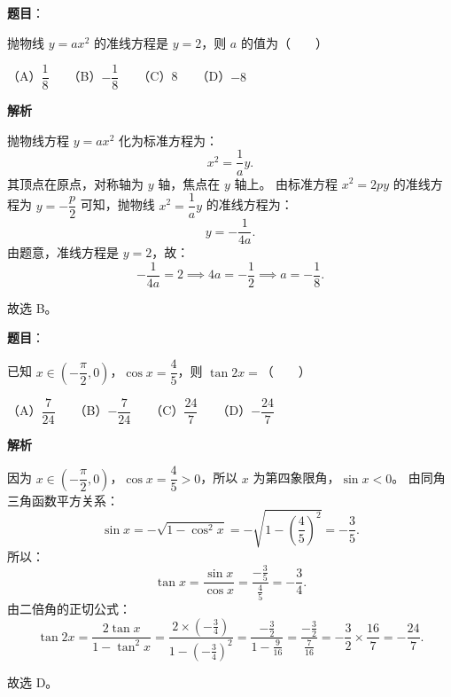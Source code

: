 \begin{answer}

\textbf{题目}：

抛物线 $y = ax^2$ 的准线方程是 $y = 2$，则 $a$ 的值为\mbox{（　　）}

（A）$\dfrac{1}{8}$　　（B）$-\dfrac{1}{8}$　　（C）8　　（D）$-8$

\textbf{解析}

抛物线方程 $y = ax^2$ 化为标准方程为：
\nopagebreak[4]
\[x^2 = \frac{1}{a} y.\]
其顶点在原点，对称轴为 $y$ 轴，焦点在 $y$ 轴上。
由标准方程 $x^2 = 2py$ 的准线方程为 $y = -\dfrac{p}{2}$ 可知，抛物线 $x^2 = \dfrac{1}{a} y$ 的准线方程为：
\nopagebreak[4]
\[y = -\frac{1}{4a}.\]
由题意，准线方程是 $y = 2$，故：
\nopagebreak[4]
\[-\frac{1}{4a} = 2 \implies 4a = -\frac{1}{2} \implies a = -\frac{1}{8}.\]

故选 B。


\end{answer}
\begin{answer}

\textbf{题目}：

已知 $x \in \left(-\dfrac{\pi}{2}, 0\right)$，$\cos x = \dfrac{4}{5}$，则 $\tan 2x =$\mbox{（　　）}

（A）$\dfrac{7}{24}$　　（B）$-\dfrac{7}{24}$　　（C）$\dfrac{24}{7}$　　（D）$-\dfrac{24}{7}$

\textbf{解析}

因为 $x \in \left(-\dfrac{\pi}{2}, 0\right)$，$\cos x = \dfrac{4}{5} > 0$，所以 $x$ 为第四象限角，$\sin x < 0$。
由同角三角函数平方关系：
\nopagebreak[4]
\[\sin x = -\sqrt{1 - \cos^2 x} = -\sqrt{1 - \left(\frac{4}{5}\right)^2} = -\frac{3}{5}.\]
所以：
\nopagebreak[4]
\[\tan x = \frac{\sin x}{\cos x} = \frac{-\frac{3}{5}}{\frac{4}{5}} = -\frac{3}{4}.\]
由二倍角的正切公式：
\nopagebreak[4]
\[\tan 2x = \frac{2\tan x}{1 - \tan^2 x} = \frac{2 \times \left(-\frac{3}{4}\right)}{1 - \left(-\frac{3}{4}\right)^2} = \frac{-\frac{3}{2}}{1 - \frac{9}{16}} = \frac{-\frac{3}{2}}{\frac{7}{16}} = -\frac{3}{2} \times \frac{16}{7} = -\frac{24}{7}.\]

故选 D。


\end{answer}
